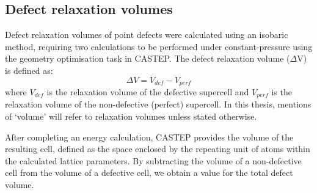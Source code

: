%

\subsection{Defect relaxation volumes} \label{isobaricmethod}

Defect relaxation volumes of point defects were calculated using an isobaric method, requiring two calculations to be performed under constant-pressure using the geometry optimisation task in CASTEP. The defect relaxation volume ($\Delta$V) is defined as: 
\begin{equation}
\Delta V = V_{def} - V_{perf}
\end{equation}
where $V_{def}$ is the relaxation volume of the defective supercell and $V_{perf}$ is the relaxation volume of the non-defective (perfect) supercell. In this thesis, mentions of `volume' will refer to relaxation volumes unless stated otherwise.

After completing an energy calculation, CASTEP provides the volume of the resulting cell, defined as the space enclosed by the repeating unit of atoms within the calculated lattice parameters. By subtracting the volume of a non-defective cell from the volume of a defective cell, we obtain a value for the total defect volume. 

